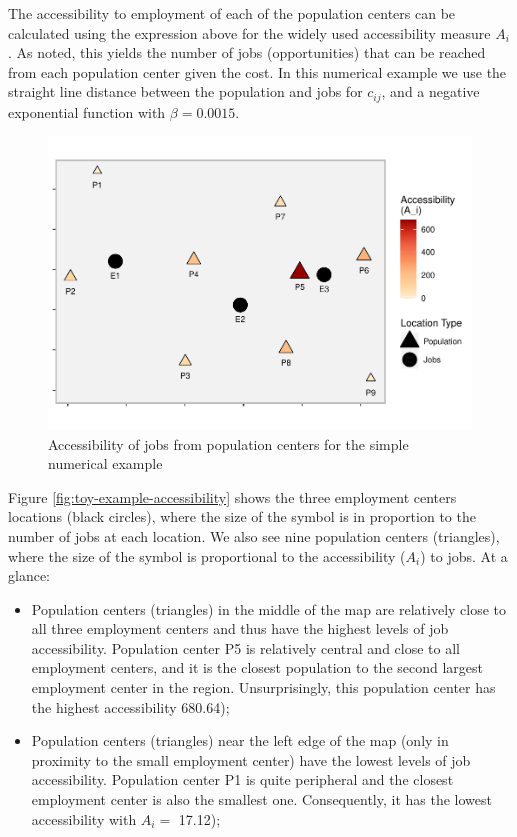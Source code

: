 \documentclass[]{elsarticle} %
\begin{document}
The accessibility to employment of each of the population centers can be
calculated using the expression above for the widely used accessibility
measure \(A_i\). As noted, this yields the number of jobs
(opportunities) that can be reached from each population center given
the cost. In this numerical example we use the straight line distance
between the population and jobs for \(c_{ij}\), and a negative
exponential function with \(\beta = 0.0015\).

\begin{figure}
\includegraphics[width=1\linewidth]{Spatial-Availability_files/figure-latex/toy-example-accessibility-plot-1} \caption{\label{fig:toy-example-accessibility}Accessibility of jobs from population centers for the simple numerical example}\label{fig:toy-example-accessibility-plot}
\end{figure}

Figure \ref{fig:toy-example-accessibility} shows the three employment
centers locations (black circles), where the size of the symbol is in
proportion to the number of jobs at each location. We also see nine
population centers (triangles), where the size of the symbol is
proportional to the accessibility (\(A_i\)) to jobs. At a glance:

\begin{itemize}
\item
  Population centers (triangles) in the middle of the map are relatively
  close to all three employment centers and thus have the highest levels
  of job accessibility. Population center P5 is relatively central and
  close to all employment centers, and it is the closest population to
  the second largest employment center in the region. Unsurprisingly,
  this population center has the highest accessibility 680.64);
\item
  Population centers (triangles) near the left edge of the map (only in
  proximity to the small employment center) have the lowest levels of
  job accessibility. Population center P1 is quite peripheral and the
  closest employment center is also the smallest one. Consequently, it
  has the lowest accessibility with \(A_i=\) 17.12);
\end{itemize}
\end{document}
